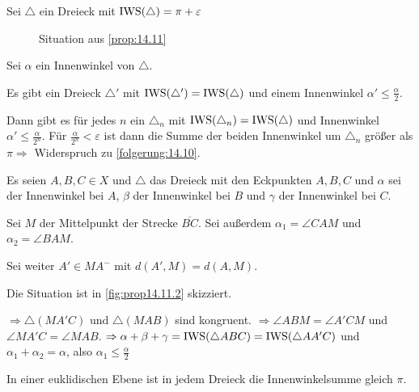 \begin{beweis}
    Sei $\triangle$ ein Dreieck mit $\operatorname{IWS}(\triangle) = \pi + \varepsilon$

    \begin{figure}[ht]
        \centering
        \label{fig:prop14.11.0}
        \caption{Situation aus \cref{prop:14.11}}
    \end{figure}

    Sei $\alpha$ ein Innenwinkel von $\triangle$.

    \begin{behauptung}
        Es gibt ein Dreieck $\triangle'$ mit
        $\operatorname{IWS}(\triangle') = \operatorname{IWS}(\triangle)$ und einem Innenwinkel
        $\alpha' \leq \frac{\alpha}{2}$.

        Dann gibt es für jedes $n$ ein $\triangle_n$ mit $\operatorname{IWS}(\triangle_n) = \operatorname{IWS}(\triangle)$
        und Innenwinkel $\alpha' \leq \frac{\alpha}{2^n}$. Für $\frac{\alpha}{2^n} < \varepsilon$
        ist dann die Summe der beiden Innenwinkel
        um $\triangle_n$ größer als $\pi \Rightarrow$ Widerspruch zu
        \cref{folgerung:14.10}.
    \end{behauptung}

    \begin{beweis}
        Es seien $A, B, C \in X$ und $\triangle $ das Dreieck mit den
        Eckpunkten $A, B, C$ und $\alpha$ sei der Innenwinkel bei $A$,
        $\beta$ der Innenwinkel bei $B$ und $\gamma$ der Innenwinkel bei $C$.

        Sei $M$ der Mittelpunkt der Strecke $\overline{BC}$. Sei außerdem
        $\alpha_1 = \angle CAM$ und $\alpha_2 = \angle BAM$.

        Sei weiter $A' \in MA^-$ mit $d(A', M) = d(A, M)$.

        Die Situation ist in \cref{fig:prop14.11.2} skizziert.

        $ \Rightarrow \triangle(MA'C)$ und
        $\triangle(MAB)$ sind kongruent.
        $\Rightarrow \angle ABM = \angle A'CM$ und $\angle MA'C = \angle MAB$.
        $\Rightarrow \alpha + \beta + \gamma =\operatorname{IWS}(\triangle ABC) = \operatorname{IWS}(\triangle AA'C)$
        und $\alpha_1 + \alpha_2 = \alpha$, also \obda $\alpha_1 \leq \frac{\alpha}{2}$
    \end{beweis}
\end{beweis}
\begin{bemerkung}\label{bem:14.12}%
    In einer euklidischen Ebene ist in jedem Dreieck die Innenwinkelsumme
    gleich $\pi$.
\end{bemerkung}

